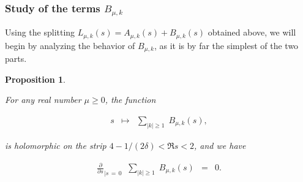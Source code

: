 \documentclass{jams-l}
\newtheorem{proposition}[theorem]{Proposition}
\theoremstyle{definition}
\theoremstyle{remark}
\numberwithin{equation}{section}
\begin{document}
        
        
        \subsubsection{Study of the terms $B_{\mu,k}$}
        \label{SubSubSecStudyBmuk}
        
            Using the splitting $L_{\mu,k} \left( s \right) = A_{\mu,k} \left( s \right) + B_{\mu,k} \left( s \right)$ obtained above, we will begin by analyzing the behavior of $B_{\mu,k}$, as it is by far the simplest of the two parts.
            
            \begin{proposition}
            \label{PropBmuk}
        
                For any real number $\mu \geqslant 0$, the function
            
                \[ \begin{array}{lll}
                        s & \longmapsto & \sum\limits_{\left \vert k \right \vert \geqslant 1} \; B_{\mu,k} \left( s \right),
                    \end{array} \]
            
                \noindent is holomorphic on the strip $4-1/\left( 2 \delta \right) < \Re s < 2$, and we have
            
                \[ \begin{array}{lll}
                        \frac{\partial}{\partial s}_{\vert s \, = \, 0} \; \; \sum\limits_{\left \vert k \right \vert \geqslant 1} \; B_{\mu,k} \left( s \right) & = & 0.
                    \end{array} \]
        
            \end{proposition}
            
\end{document}
